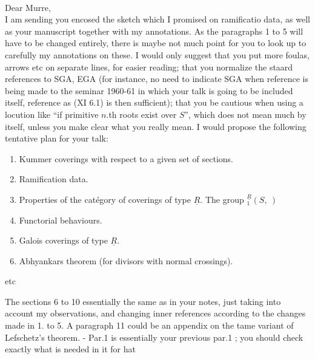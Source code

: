 \hfill{}\\

Dear Murre,\\

I am sending you encosed the sketch which I promised on ramificatio
data, as well as your manuscript together with my annotations. As the paragraphs 1 to 5 will have to be changed entirely, there is maybe not much point for you to look up to carefully my annotations on these.  I would only suggest that you put more foulas, arrows etc on  separate lines, for easier reading; that you normalize the staard references to SGA, EGA (for instance, no need to indicate SGA when reference is being made to the seminar 1960-61 in which your talk is going to be included itself, reference as (XI 6.1) is then sufficient); that you be cautious when using a locution like ``if primitive $n$.th roots exist over $S$'', which does not mean much by itself, unless you make clear what you really mean. I would propose the following tentative plan for your talk:

\begin{enumerate}[label={}]
\item[1.] Kummer coverings with respect to a given set of sections.
\item[2.] \reversemarginpar
{}
\normalmarginpar Ramification data.
\item[3.] Properties of the catégory of coverings of type $\underline{R}$. The group ${}_{1}^{\underline{R}}(S,\ )$
\item[4.] Functorial behaviours.
\item[5.] Galois coverings of type $\underline{R}$.
\item[6.] Abhyankars theorem (for divisors with normal crossings).
\end{enumerate}
etc

The sections 6 to 10 essentially the same as in your notes, just taking into account my observations, and changing inner references according to the changes made in 1. to 5. A paragraph 11 could be an appendix on the tame variant of Lefschetz's theorem. - Par.1 is essentially your previous par.1 ; you should check exactly what is needed in it for hat
